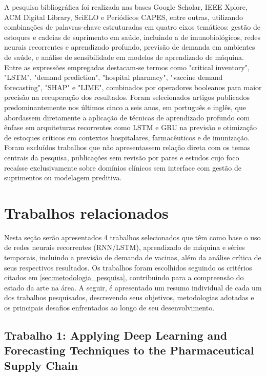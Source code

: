 \documentclass[
    12pt,                %
    openright,           %
    oneside,             %
    a4paper,             %
    english,             %
    brazil               %
]{abntex2}
\begin{document}
A pesquisa bibliográfica foi realizada nas bases Google Scholar, IEEE Xplore, ACM Digital Library, SciELO e Periódicos CAPES, entre outras, utilizando combinações de palavras-chave estruturadas em quatro eixos temáticos: gestão de estoques e cadeias de suprimento em saúde, incluindo a de imunobiológicos, redes neurais recorrentes e aprendizado profundo, previsão de demanda em ambientes de saúde, e análise de sensibilidade em modelos de aprendizado de máquina. Entre as expressões empregadas destacam-se termos como "critical inventory", "LSTM", "demand prediction", "hospital pharmacy", "vaccine demand forecasting", "SHAP" e "LIME", combinados por operadores booleanos para maior precisão na recuperação dos resultados. Foram selecionados artigos publicados predominantemente nos últimos cinco a seis anos, em português e inglês, que abordassem diretamente a aplicação de técnicas de aprendizado profundo com ênfase em arquiteturas recorrentes como LSTM e GRU na previsão e otimização de estoques críticos em contextos hospitalares, farmacêuticos e de imunização. Foram excluídos trabalhos que não apresentassem relação direta com os temas centrais da pesquisa, publicações sem revisão por pares e estudos cujo foco recaísse exclusivamente sobre domínios clínicos sem interface com gestão de suprimentos ou modelagem preditiva.

\section{Trabalhos relacionados}
\label{sec:trabalhos_relacionados}

Nesta seção serão apresentados 4 trabalhos selecionados que têm como base o uso de redes neurais recorrentes (RNN/LSTM), aprendizado de máquina e séries temporais, incluindo a previsão de demanda de vacinas, além da análise crítica de seus respectivos resultados. Os trabalhos foram escolhidos seguindo os critérios citados em \ref{sec:metodologia_pesquisa}, contribuindo para a compreensão do estado da arte na área. A seguir, é apresentado um resumo individual de cada um dos trabalhos pesquisados, descrevendo seus objetivos, metodologias adotadas e os principais desafios enfrentados ao longo de seu desenvolvimento.

\subsection{Trabalho 1: Applying Deep Learning and Forecasting Techniques to the Pharmaceutical Supply Chain}
\end{document}

